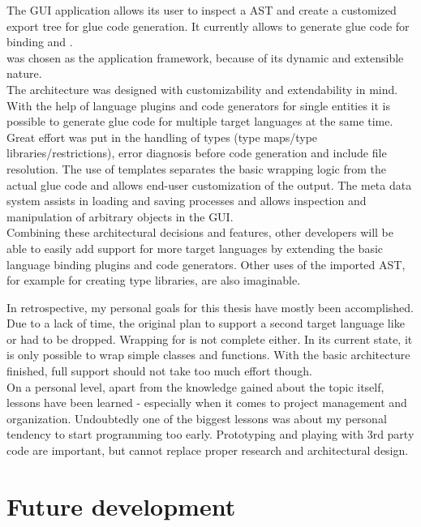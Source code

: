 The  GUI application allows its user to inspect a  AST and create a customized export tree for glue code generation. It currently allows to generate glue code for binding  and .\\
 was chosen as the application framework, because of its dynamic and extensible nature.\\
The architecture was designed with customizability and extendability in mind. With the help of language plugins and code generators for single  entities it is possible to generate glue code for multiple target languages at the same time. Great effort was put in the handling of types (type maps/type libraries/restrictions), error diagnosis before code generation and include file resolution. The use of templates separates the basic wrapping logic from the actual glue code and allows end-user customization of the output. The meta data system assists in loading and saving processes and allows inspection and manipulation of arbitrary  objects in the GUI.\\
Combining these architectural decisions and features, other developers will be able to easily add support for more target languages by extending the basic language binding plugins and code generators. Other uses of the imported  AST, for example for creating type libraries, are also imaginable.

In retrospective, my personal goals for this thesis have mostly been accomplished.\\
Due to a lack of time, the original plan to support a second target language like  or  had to be dropped. Wrapping for  is not complete either. In its current state, it is only possible to wrap simple classes and functions. With the basic architecture finished, full support should not take too much effort though.\\
On a personal level, apart from the knowledge gained about the topic itself, lessons have been learned - especially when it comes to project management and organization. Undoubtedly one of the biggest lessons was about my personal tendency to start programming too early. Prototyping and playing with 3rd party code are important, but cannot replace proper research and architectural design.

\chapter{Future development}
\label{chap:FutureDevelopment}

